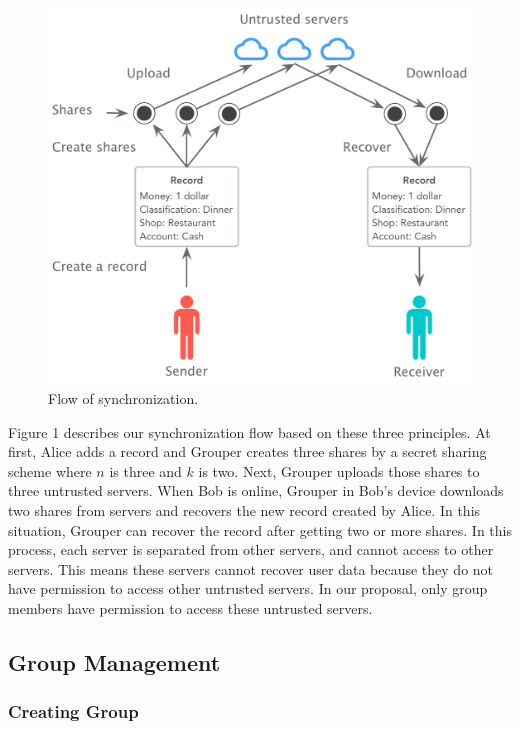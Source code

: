 \documentclass[twocolumn,10pt]{article}
\begin{document}
\begin{figure}[t]
	\centering
	\includegraphics[scale=0.38]{sync_flow}
	\caption{Flow of synchronization.}
\end{figure}

Figure 1 describes our synchronization flow based on these three principles. At first, Alice adds a record and Grouper creates three shares by a secret sharing scheme where $n$ is three and $k$ is two. Next, Grouper uploads those shares to three untrusted servers. When Bob is online, Grouper in Bob's device downloads two shares from servers and recovers the new record created by Alice. In this situation, Grouper can recover the record after getting two or more shares. In this process, each server is separated from other servers, and cannot access to other servers. This means these servers cannot recover user data because they do not have permission to access other untrusted servers. In our proposal, only group members have permission to access these untrusted servers.

\subsection{Group Management}

\subsubsection{Creating Group}
\end{document}
